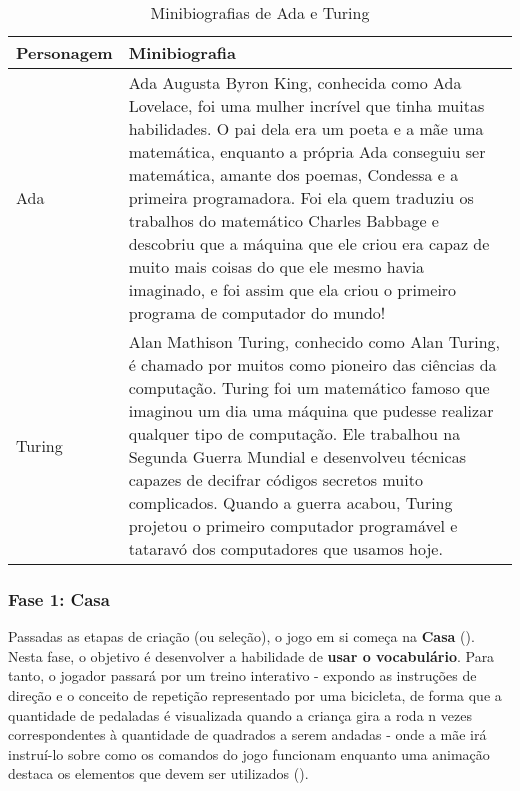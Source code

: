 \begin{table}[H]
\centering
\caption{Minibiografias de Ada e Turing}
\label{tab:minibiografias}
\begin{tabular}{|l|p{12cm}|}
\hline
\textbf{Personagem} & \textbf{Minibiografia}                                                                                                                                                                                                                                                                                                                                                                                                                                                                                                \\ \hline
Ada                 & Ada Augusta Byron King, conhecida como Ada Lovelace, foi uma mulher incrível que tinha muitas habilidades. O pai dela era um poeta e a mãe uma matemática, enquanto a própria Ada conseguiu ser matemática, amante dos poemas, Condessa e a primeira programadora. Foi ela quem traduziu os trabalhos do matemático Charles Babbage e descobriu que a máquina que ele criou era capaz de muito mais coisas do que ele mesmo havia imaginado, e foi assim que ela criou o primeiro programa de computador do mundo! \\ \hline
Turing              & Alan Mathison Turing, conhecido como Alan Turing, é chamado por muitos como pioneiro das ciências da computação. Turing foi um matemático famoso que imaginou um dia uma máquina que pudesse realizar qualquer tipo de computação. Ele trabalhou na Segunda Guerra Mundial e desenvolveu técnicas capazes de decifrar códigos secretos muito complicados. Quando a guerra acabou, Turing projetou o primeiro computador programável e tataravó dos computadores que usamos hoje.                                    \\ \hline
\end{tabular}
\end{table}

\subsubsection{Fase 1: Casa} \label{sssec:fase_1}

Passadas as etapas de criação (ou seleção), o jogo em si começa na \textbf{Casa} (). Nesta fase, o objetivo é desenvolver a habilidade de \textbf{usar o vocabulário}. Para tanto, o jogador passará por um treino interativo - expondo as instruções de direção e o conceito de repetição representado por uma bicicleta, de forma que a quantidade de pedaladas é visualizada quando a criança gira a roda n vezes correspondentes à quantidade de quadrados a serem andadas - onde a mãe irá instruí-lo sobre como os comandos do jogo funcionam enquanto uma animação destaca os elementos que devem ser utilizados (). 

